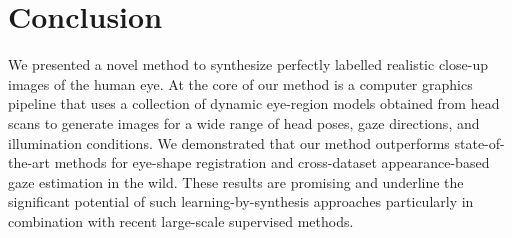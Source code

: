 
\section{Conclusion}


We presented a novel method to synthesize perfectly labelled realistic close-up images of the human eye.
At the core of our method is a computer graphics pipeline that uses a collection of dynamic eye-region models obtained from head scans to generate images for a wide range of head poses, gaze directions, and illumination conditions.
We demonstrated that our method outperforms state-of-the-art methods for eye-shape registration and cross-dataset appearance-based gaze estimation in the wild.
These results are promising and underline the significant potential of such learning-by-synthesis approaches particularly in combination with recent large-scale supervised methods.